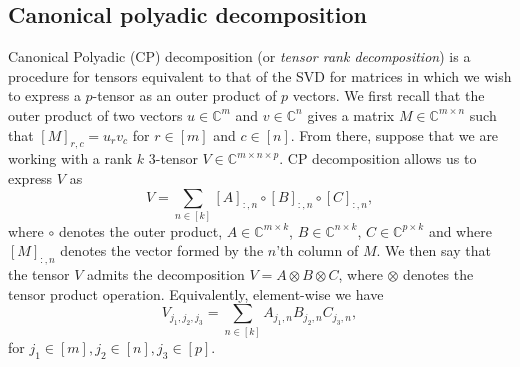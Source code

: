 \subsection{Canonical polyadic decomposition}
Canonical Polyadic (CP) decomposition (or \textit{tensor rank decomposition}) is a procedure for tensors equivalent to that of the SVD for matrices in which we wish to express a $p$-tensor as an outer product of $p$ vectors. We first recall that the outer product of two vectors $u\in\mathbb{C}^m$ and $v\in\mathbb{C}^n$ gives a matrix $M\in\mathbb{C}^{m\times n}$ such that $[M]_{r,c}=u_rv_c$ for $r\in[m]$ and $c\in[n]$. From there, suppose that we are working with a rank $k$ 3-tensor $V\in\mathbb{C}^{m\times n\times p}$. CP decomposition allows us to express $V$ as
\begin{equation}
    V=\sum_{n\in[k]}[A]_{:,n}\circ[B]_{:,n}\circ[C]_{:,n},    
\end{equation} where $\circ$ denotes the outer product, $A\in\mathbb{C}^{m\times k}$, $B\in\mathbb{C}^{n\times k}$, $C\in\mathbb{C}^{p\times k}$ and where $[M]_{:,n}$ denotes the vector formed by the $n$'th column of $M$. We then say that the tensor $V$ admits the decomposition $V=A\otimes B\otimes C$, where $\otimes$ denotes the tensor product operation. Equivalently, element-wise we have 
\begin{equation}
    V_{j_1,j_2,j_3}=\sum_{n\in[k]}A_{j_1,n}B_{j_2,n}C_{j_3,n},
\end{equation} for $j_1\in[m],j_2\in[n],j_3\in[p]$.
